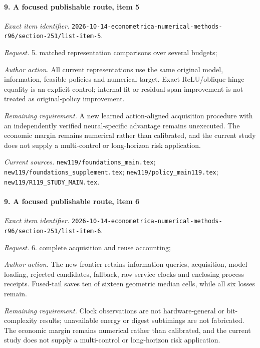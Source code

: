 \paragraph{9. A focused publishable route, item 5}

\emph{Exact item identifier.} \nolinkurl{2026-10-14-econometrica-numerical-methods-r96/section-251/list-item-5}.

\par\emph{Request.} 5. matched representation comparisons over several budgets;

\par\emph{Author action.} All current representations use the same original model, information, feasible policies and numerical target. Exact ReLU/\allowbreak{}oblique-hinge equality is an explicit control; internal fit or residual-span improvement is not treated as original-policy improvement.

\par\emph{Remaining requirement.} A new learned action-aligned acquisition procedure with an independently verified neural-specific advantage remains unexecuted. The economic margin remains numerical rather than calibrated, and the current study does not supply a multi-control or long-horizon risk application.

\par\emph{Current sources.} \nolinkurl{new119/foundations_main.tex}; \nolinkurl{new119/foundations_supplement.tex}; \nolinkurl{new119/policy_main119.tex}; \nolinkurl{new119/R119_STUDY_MAIN.tex}.

\paragraph{9. A focused publishable route, item 6}

\emph{Exact item identifier.} \nolinkurl{2026-10-14-econometrica-numerical-methods-r96/section-251/list-item-6}.

\par\emph{Request.} 6. complete acquisition and reuse accounting;

\par\emph{Author action.} The new frontier retains information queries, acquisition, model loading, rejected candidates, fallback, raw service clocks and enclosing process receipts. Fused-tail saves ten of sixteen geometric median cells, while all six losses remain.

\par\emph{Remaining requirement.} Clock observations are not hardware-general or bit-complexity results; unavailable energy or digest subtimings are not fabricated. The economic margin remains numerical rather than calibrated, and the current study does not supply a multi-control or long-horizon risk application.

